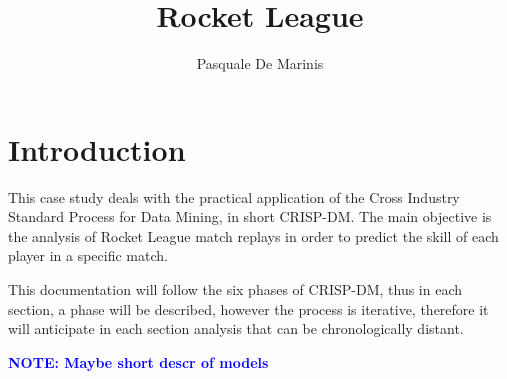 \documentclass[
	12pt, %
]{fphw}
\title{Rocket League}
\author{Pasquale De Marinis}
\institute{University of Bari \\ Department of Computer Science} %
\newcommand{\note}[1]{\textbf{\textcolor{blue}{{NOTE: #1}}}}
\begin{document}
\maketitle
\tableofcontents\newpage

\section{Introduction}

This case study deals with the practical application of the Cross Industry Standard Process for Data Mining, in short CRISP-DM. The main objective is the analysis of Rocket League match replays in order to predict the skill of each player in a specific match.

This documentation will follow the six phases of CRISP-DM, thus in each section, a phase will be described, however the process is iterative, therefore it will anticipate in each section analysis that can be chronologically distant.




\note{Maybe short descr of models}

\newpage

\end{document}
